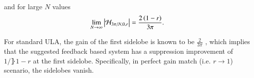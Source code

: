 and for large $N$ values 
\begin{equation*}
    \lim_{N\rightarrow\infty}\abs{\Hr_{3\pi/N,0,r}\omegaB}=\frac{
    2\rBrace{1-r}
    }{
    3\pi
    }.
\end{equation*}
\ifdefined\showDev
\else
\fi
\par For standard ULA, the gain of the first sidelobe is known to be $\frac{2}{3\pi}$ \cite{van2004optimum}, which implies that the suggested feedback based system has a suppression improvement of $1/\rBrace{1-r}$ at the first sidelobe.
Specifically, in perfect gain match (i.e. $r\to{}1$) scenario, the sidelobes vanish. 
